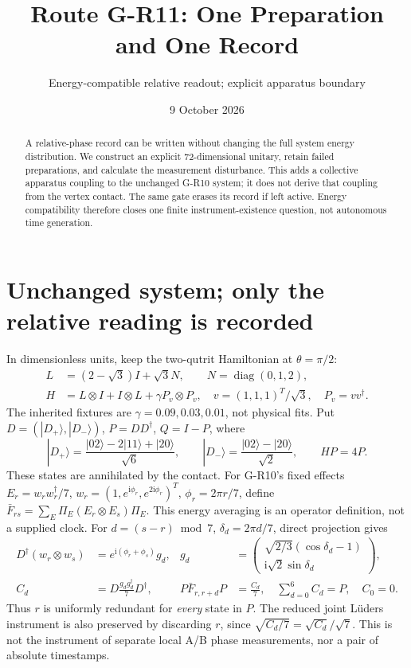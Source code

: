 \documentclass[11pt,a4paper]{article}
\title{Route G-R11: One Preparation and One Record}
\author{Energy-compatible relative readout; explicit apparatus boundary}
\date{9 October 2026}
\newcommand{\ii}{\mathrm i}
\newcommand{\ket}[1]{|#1\rangle}
\begin{document}
\maketitle
\begin{abstract}
A relative-phase record can be written without changing the full system
energy distribution. We construct an explicit 72-dimensional unitary,
retain failed preparations, and calculate the measurement disturbance.
This adds a collective apparatus coupling to the unchanged G-R10 system;
it does not derive that coupling from the vertex contact. The same gate
erases its record if left active. Energy compatibility therefore closes
one finite instrument-existence question, not autonomous time generation.
\end{abstract}

\section{Unchanged system; only the relative reading is recorded}
In dimensionless units, keep the two-qutrit Hamiltonian at $\theta=\pi/2$:
\begin{align}
 L&=(2-\sqrt3)I+\sqrt3 N,\qquad N=\operatorname{diag}(0,1,2),\\
 H&=L\otimes I+I\otimes L+\gamma P_v\otimes P_v,
 \quad v=(1,1,1)^T/\sqrt3,\quad P_v=vv^\dagger.\label{H}
\end{align}
The inherited fixtures are $\gamma=0.09,0.03,0.01$, not physical fits.
Put $D=(\ket{D_+},\ket{D_-})$, $P=DD^\dagger$, $Q=I-P$, where
\begin{equation}
 \ket{D_+}=\frac{\ket{02}-2\ket{11}+\ket{20}}{\sqrt6},\qquad
 \ket{D_-}=\frac{\ket{02}-\ket{20}}{\sqrt2},\qquad HP=4P.
\end{equation}
These states are annihilated by the contact. For G-R10's fixed effects
$E_r=w_rw_r^\dagger/7$, $w_r=(1,e^{\ii\phi_r},e^{2\ii\phi_r})^T$,
$\phi_r=2\pi r/7$, define $\bar F_{rs}=\sum_E\Pi_E(E_r\otimes E_s)\Pi_E$.
This energy averaging is an operator definition, not a supplied clock.
For $d=(s-r)\bmod7$, $\delta_d=2\pi d/7$, direct projection gives
\begin{align}
 D^\dagger(w_r\otimes w_s)&=e^{\ii(\phi_r+\phi_s)}g_d,
 &g_d&=\begin{pmatrix}\sqrt{2/3}(\cos\delta_d-1)\\
                  \ii\sqrt2\sin\delta_d\end{pmatrix},\\
 C_d&=D\frac{g_dg_d^\dagger}{7}D^\dagger,
 &P\bar F_{r,r+d}P&=\frac{C_d}{7},\quad
 \sum_{d=0}^6C_d=P,\quad C_0=0.\label{compress}
\end{align}
Thus $r$ is uniformly redundant for \emph{every} state in $P$.
The reduced joint L\"uders instrument is also preserved by discarding $r$,
since $\sqrt{C_d/7}=\sqrt{C_d}/\sqrt7$. This is not the instrument of
separate local A/B phase measurements, nor a pair of absolute timestamps.
\end{document}

